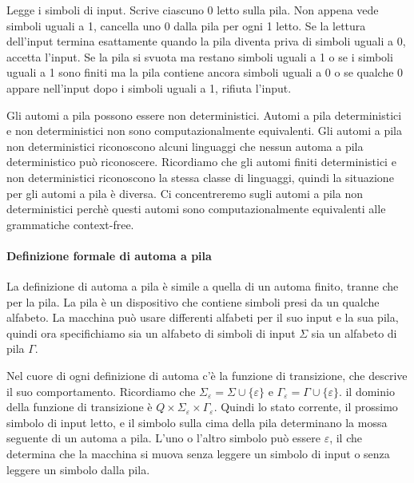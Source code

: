 \documentclass{article}
\begin{document}
Legge i simboli di input. Scrive ciascuno 0 letto sulla pila. Non appena vede simboli uguali a 1, cancella uno 0 dalla pila per ogni 1 letto. Se la lettura dell'input termina esattamente quando la pila diventa priva di simboli uguali a 0, accetta l'input. Se la pila si svuota ma restano simboli uguali a 1 o se i simboli uguali a 1 sono finiti ma la pila contiene ancora simboli uguali a 0 o se qualche 0 appare nell'input dopo i simboli uguali a 1, rifiuta l'input.
\vspace{2em}

Gli automi a pila possono essere non deterministici. 
Automi a pila deterministici e non deterministici non sono computazionalmente equivalenti. 
Gli automi a pila non deterministici riconoscono alcuni linguaggi che nessun automa a pila deterministico può riconoscere. Ricordiamo che gli automi finiti deterministici e non deterministici riconoscono la stessa classe di linguaggi, quindi la situazione per gli automi a pila è diversa. Ci concentreremo sugli automi a pila non deterministici perchè questi automi sono computazionalmente equivalenti alle grammatiche context-free.

\paragraph{Definizione formale di automa a pila}
\text{ }

La definizione di automa a pila è simile a quella di un automa finito, tranne che per la pila. La pila è un dispositivo che contiene simboli presi da un qualche alfabeto. La macchina può usare differenti alfabeti per il suo input e la sua pila, quindi ora specifichiamo sia un alfabeto di simboli di input $\Sigma$ sia un alfabeto di pila $\Gamma$.

Nel cuore di ogni definizione di automa c'è la funzione di transizione, che descrive il suo comportamento. Ricordiamo che $\Sigma_\varepsilon = \Sigma \cup \{\varepsilon \}$ e $\Gamma_\varepsilon = \Gamma \cup \{\varepsilon \}$. il dominio della funzione di transizione è $Q \times \Sigma_{\varepsilon} \times \Gamma_\varepsilon$.
Quindi lo stato corrente, il prossimo simbolo di input letto, e il simbolo sulla cima della pila determinano la mossa seguente di un automa a pila.
L'uno o l'altro simbolo può essere $\varepsilon$, il che determina che la macchina si muova senza leggere un simbolo di input o senza leggere un simbolo dalla pila.
\end{document}

